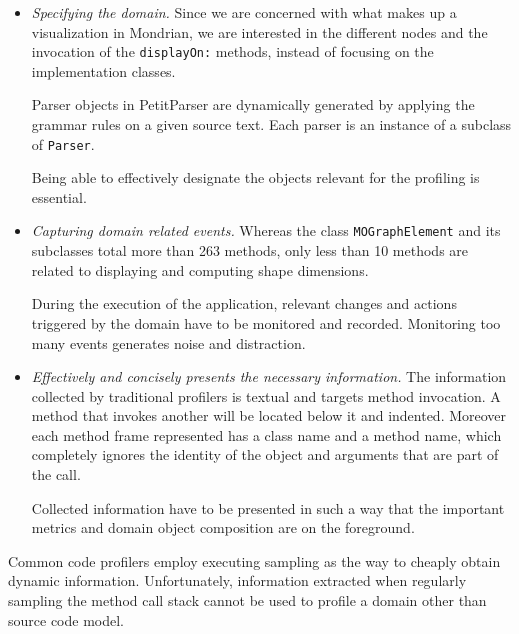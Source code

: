 \documentclass[runningheads]{llncs}
\newcommand{\ct}{\lstinline[backgroundcolor=\color{white},basicstyle=\footnotesize\ttfamily]}
\newcommand{\lr}[1]{\nb{Lukas}{orange}{#1}}
\begin{document}
\begin{itemize}
\item \emph{Specifying the domain.} Since we are concerned with what makes up a visualization in Mondrian, we are interested in the different nodes and the invocation of the \ct{displayOn:} methods, instead of focusing on the implementation classes. 

Parser objects in PetitParser are dynamically generated by applying the grammar rules on a given source text. Each parser is an instance of a subclass of \ct{Parser}. 

Being able to effectively designate the objects relevant for the profiling is essential.

\item \emph{Capturing domain related events.}
Whereas the class \ct{MOGraphElement} and its subclasses total more than 263 methods, only less than 10 methods are related to displaying and computing shape dimensions. 

 During the execution of the application, relevant changes and actions triggered by the domain have to be monitored and recorded. Monitoring too many events generates noise and distraction. 
 
\item \emph{Effectively and concisely presents the necessary information.} 
The information collected by traditional profilers is textual and targets method invocation. A method that invokes another will be located below it and indented. Moreover each method frame represented has a class name and a method name, which completely ignores the identity of the object and arguments that are part of the call.

Collected information have to be presented in such a way that the important metrics and domain object composition are on the foreground.  

\end{itemize}


Common code profilers employ executing sampling as the way to cheaply obtain dynamic information. Unfortunately, information extracted when regularly sampling the method call stack cannot be used to profile a domain other than source code model.
\end{document}
